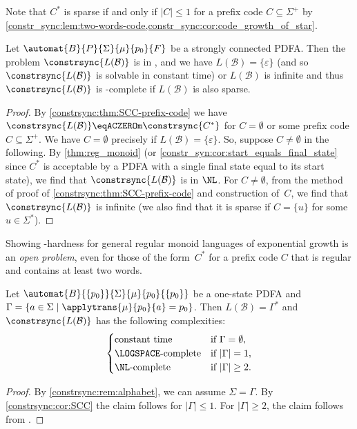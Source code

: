 Note that $C^*$ is sparse if and only if $|C| \le 1$ for a prefix code $C \subseteq \Sigma^+$ by \cref{constr_sync:lem:two-words-code,constr_sync:cor:code_growth_of_star}.

\begin{corollary}
\label{constrsync:cor:SCC}
Let $\automat{B}{P}{\Sigma}{\mu}{p_0}{F}$ be a strongly connected PDFA.
Then the problem $\constrsync{L(\mathcal B)}$ is in \NL,
and we have $L(\mathcal B) = \{\varepsilon\}$ (and so $\constrsync{L(\mathcal B)}$ is solvable in constant time)
or $L(\mathcal B)$ is infinite
and thus $\constrsync{L(\mathcal B)}$ is \LOGSPACE-complete if $L(\mathcal B)$ is also sparse.
\end{corollary}
\begin{proof}
	By \cref{constrsync:thm:SCC-prefix-code}
	we have $\constrsync{L(\mathcal B)}
	\eqACZEROm \constrsync{C^*}$
	for $C = \emptyset$ or some prefix code $C \subseteq \Sigma^+$.
	We have $C = \emptyset$
	precisely if $L(\mathcal B) = \{\varepsilon\}$.
	So, suppose $C \ne \emptyset$ in the following.
	By \cref{thm:reg_monoid} (or \cref{constr_syn:cor:start_equals_final_state}
	since $C^*$ is acceptable by a PDFA with a single final state equal to its start state),
	we find that $\constrsync{L(\mathcal B)}$ is in $\NL$.
	For $C \ne \emptyset$,
	from the method of proof of \cref{constrsync:thm:SCC-prefix-code} and construction of~$C$,
	we find that $\constrsync{L(\mathcal B)}$
	is infinite (we also find that it is sparse if $C = \{u\}$
	for some $u \in \Sigma^*$).	
\end{proof}

Showing \NL-hardness for general regular monoid languages of exponential growth is an \emph{open problem},
even for those of the form~$C^*$ for a prefix code $C$ that is regular and contains at least two words.

\begin{corollary}
	\label{constr_sync:cor:one-state}
	Let $\automat{B}{\{p_0\}}{\Sigma}{\mu}{p_0}{\{p_0\}}$ 
	be a one-state PDFA and $\Gamma = \{ a \in \Sigma \mid \applytrans{\mu}{p_0}{a} = p_0 \}$.
	Then $L(\mathcal B) = \Gamma^*$ and $\constrsync{L(\mathcal B)}$
	has the following complexities:
	\[
	\begin{cases}
		\text{constant time} & \text{if } \Gamma = \emptyset, \\
		\text{\LOGSPACE-complete} & \text{if } |\Gamma| = 1, \\
		\text{\NL-complete} 	& \text{if } |\Gamma| \ge 2.
	\end{cases}
	\]	
\end{corollary}
\begin{proof}
	By \cref{constrsync:rem:alphabet}, 
	we can assume $\Sigma = \Gamma$.
	By \cref{constrsync:cor:SCC}
	the claim follows for $|\Gamma| \le 1$.
	For $|\Gamma| \ge 2$, the claim follows from .		
\end{proof}